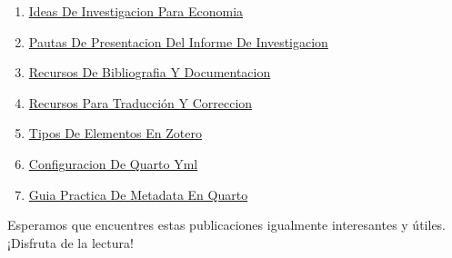 \documentclass[
  jou,
  floatsintext,
  longtable,
  a4paper,
  nolmodern,
  notxfonts,
  notimes,
  12pt,
  colorlinks=true,linkcolor=blue,citecolor=blue,urlcolor=blue]{apa7}
\providecommand{\tightlist}{%
  \setlength{\itemsep}{0pt}\setlength{\parskip}{0pt}}
\begin{document}
\begin{enumerate}
\def\labelenumi{\arabic{enumi}.}
\tightlist
\item
  \href{https://methodica.netlify.app/posts/2023-06-03-ideas-de-investigacion-para-economia/index.pdf}{}
  \href{https://methodica.netlify.app/posts/2023-06-03-ideas-de-investigacion-para-economia}{Ideas
  De Investigacion Para Economia}
\item
  \href{https://methodica.netlify.app/posts/2023-06-03-pautas-de-presentacion-del-informe-de-investigacion/index.pdf}{}
  \href{https://methodica.netlify.app/posts/2023-06-03-pautas-de-presentacion-del-informe-de-investigacion}{Pautas
  De Presentacion Del Informe De Investigacion}
\item
  \href{https://methodica.netlify.app/posts/2025-01-12-recursos-de-bibliografia-y-documentacion/index.pdf}{}
  \href{https://methodica.netlify.app/posts/2025-01-12-recursos-de-bibliografia-y-documentacion}{Recursos
  De Bibliografia Y Documentacion}
\item
  \href{https://methodica.netlify.app/posts/2025-02-09-recursos-para-traducción-y-correccion/index.pdf}{}
  \href{https://methodica.netlify.app/posts/2025-02-09-recursos-para-traducción-y-correccion}{Recursos
  Para Traducción Y Correccion}
\item
  \href{https://methodica.netlify.app/posts/2025-04-23-tipos-de-elementos-en-zotero/index.pdf}{}
  \href{https://methodica.netlify.app/posts/2025-04-23-tipos-de-elementos-en-zotero}{Tipos
  De Elementos En Zotero}
\item
  \href{https://methodica.netlify.app/posts/2026-01-02-configuracion-de-quarto-yml/index.pdf}{}
  \href{https://methodica.netlify.app/posts/2026-01-02-configuracion-de-quarto-yml}{Configuracion
  De Quarto Yml}
\item
  \href{https://methodica.netlify.app/posts/2026-01-02-guia-practica-de-metadata-en-quarto/index.pdf}{}
  \href{https://methodica.netlify.app/posts/2026-01-02-guia-practica-de-metadata-en-quarto}{Guia
  Practica De Metadata En Quarto}
\end{enumerate}

Esperamos que encuentres estas publicaciones igualmente interesantes y
útiles. ¡Disfruta de la lectura!
\end{document}
